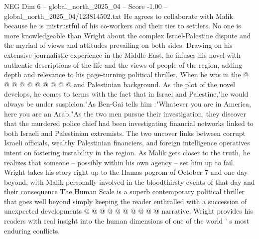 \begin{textsample}{NEG Dim 6 – global\_north\_2025\_04 – Score -1.00 – global\_north\_2025\_04/123814502.txt}
He agrees to collaborate with Malik because he is mistrustful of his co-workers and their ties to settlers.
No one is more knowledgeable than Wright about the complex Israel-Palestine dispute and the myriad of views and attitudes prevailing on both sides.
Drawing on his extensive journalistic experience in the Middle East, he infuses his novel with authentic descriptions of the life and the views of people of the region, adding depth and relevance to his page-turning political thriller.
When he was in the @ @ @ @ @ @ @ @ @ @ and Palestinian background.
As the plot of the novel develops, he comes to terms with the fact that in Israel and Palestine,"he would always be under suspicion."As Ben-Gai tells him :"Whatever you are in America, here you are an Arab."As the two men pursue their investigation, they discover that the murdered police chief had been investigating financial networks linked to both Israeli and Palestinian extremists.
The two uncover links between corrupt Israeli officials, wealthy Palestinian financiers, and foreign intelligence operatives intent on fostering instability in the region.
As Malik gets closer to the truth, he realizes that someone -- possibly within his own agency -- set him up to fail.
Wright takes his story right up to the Hamas pogrom of October 7 and one day beyond, with Malik personally involved in the bloodthirsty events of that day and their consequence The Human Scale is a superb contemporary political thriller that goes well beyond simply keeping the reader enthralled with a succession of unexpected developments @ @ @ @ @ @ @ @ @ @ narrative, Wright provides his readers with real insight into the human dimensions of one of the world ' s most enduring conflicts.

\end{textsample}
